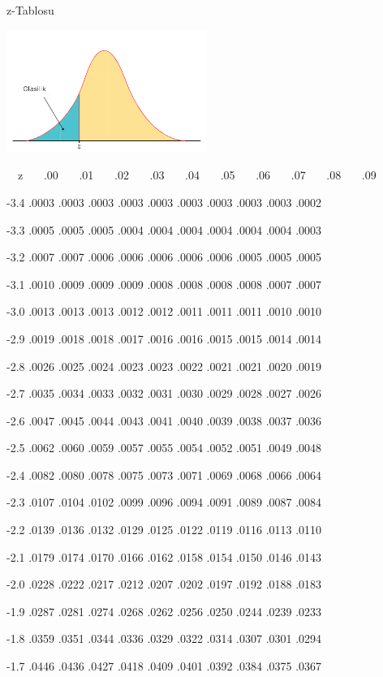 \documentclass[12pt,fleqn]{article}\usepackage{../common}
\begin{document}
z-Tablosu

\includegraphics[height=4cm]{90_1.png}

\ \ z \ \ \  .00  \ \ \ .01 \ \ \ .02 \ \ \ .03 \ \ \ .04 \ \ \ .05 \ \ \ .06 \
\ \ .07 \ \ \ .08 \ \ \ .09

-3.4 .0003 .0003 .0003 .0003 .0003 .0003 .0003 .0003 .0003 .0002

-3.3 .0005 .0005 .0005 .0004 .0004 .0004 .0004 .0004 .0004 .0003

-3.2 .0007 .0007 .0006 .0006 .0006 .0006 .0006 .0005 .0005 .0005

-3.1 .0010 .0009 .0009 .0009 .0008 .0008 .0008 .0008 .0007 .0007

-3.0 .0013 .0013 .0013 .0012 .0012 .0011 .0011 .0011 .0010 .0010

-2.9 .0019 .0018 .0018 .0017 .0016 .0016 .0015 .0015 .0014 .0014

-2.8 .0026 .0025 .0024 .0023 .0023 .0022 .0021 .0021 .0020 .0019

-2.7 .0035 .0034 .0033 .0032 .0031 .0030 .0029 .0028 .0027 .0026

-2.6 .0047 .0045 .0044 .0043 .0041 .0040 .0039 .0038 .0037 .0036

-2.5 .0062 .0060 .0059 .0057 .0055 .0054 .0052 .0051 .0049 .0048

-2.4 .0082 .0080 .0078 .0075 .0073 .0071 .0069 .0068 .0066 .0064

-2.3 .0107 .0104 .0102 .0099 .0096 .0094 .0091 .0089 .0087 .0084

-2.2 .0139 .0136 .0132 .0129 .0125 .0122 .0119 .0116 .0113 .0110

-2.1 .0179 .0174 .0170 .0166 .0162 .0158 .0154 .0150 .0146 .0143

-2.0 .0228 .0222 .0217 .0212 .0207 .0202 .0197 .0192 .0188 .0183

-1.9 .0287 .0281 .0274 .0268 .0262 .0256 .0250 .0244 .0239 .0233

-1.8 .0359 .0351 .0344 .0336 .0329 .0322 .0314 .0307 .0301 .0294

-1.7 .0446 .0436 .0427 .0418 .0409 .0401 .0392 .0384 .0375 .0367
\end{document}
